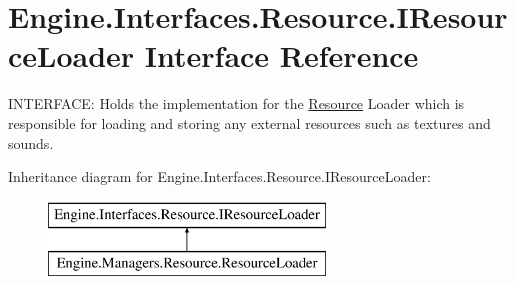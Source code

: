 \hypertarget{a00462}{}\section{Engine.\+Interfaces.\+Resource.\+I\+Resource\+Loader Interface Reference}
\label{a00462}


I\+N\+T\+E\+R\+F\+A\+CE\+: Holds the implementation for the \hyperlink{a00262}{Resource} Loader which is responsible for loading and storing any external resources such as textures and sounds.  


Inheritance diagram for Engine.\+Interfaces.\+Resource.\+I\+Resource\+Loader\+:\begin{figure}[H]
\begin{center}
\leavevmode
\includegraphics[height=2.000000cm]{de/dcb/a00462}
\end{center}
\end{figure}
